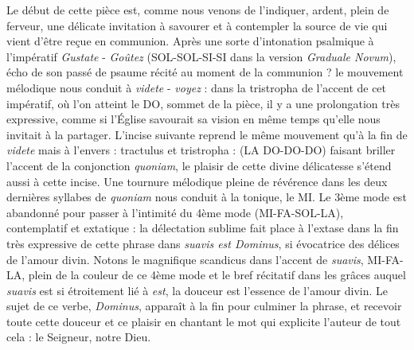 \documentclass[Session2026.tex]{subfiles}
\begin{document}
Le début de cette pièce est, comme nous venons de l'indiquer, ardent,
plein de ferveur, une délicate invitation à savourer et à contempler la
source de vie qui vient d'être reçue en communion. Après une sorte
d'intonation psalmique à l'impératif \emph{Gustate} - \emph{Goûtez}
(SOL-SOL-SI-SI dans la version \emph{Graduale Novum}), écho de son passé
de psaume récité au moment de la communion ? le mouvement mélodique nous
conduit à \emph{videte} - \emph{voyez} : dans la tristropha de l'accent
de cet impératif, où l'on atteint le DO, sommet de la pièce, il y a une
prolongation très expressive, comme si l'Église savourait sa vision en
même temps qu'elle nous invitait à la partager. L'incise suivante
reprend le même mouvement qu'à la fin de \emph{videte} mais à l'envers :
tractulus et tristropha : (LA DO-DO-DO) faisant briller l'accent de la
conjonction \emph{quoniam}, le plaisir de cette divine délicatesse
s'étend aussi à cette incise. Une tournure mélodique pleine de révérence
dans les deux dernières syllabes de \emph{quoniam} nous conduit à la
tonique, le MI. Le 3ème mode est abandonné pour passer à l'intimité du
4ème mode (MI-FA-SOL-LA), contemplatif et extatique : la délectation
sublime fait place à l'extase dans la fin très expressive de cette
phrase dans \emph{suavis est Dominus}, si évocatrice des délices de
l'amour divin. Notons le magnifique scandicus dans l'accent de
\emph{suavis}, MI-FA-LA, plein de la couleur de ce 4ème mode et le bref
récitatif dans les grâces auquel \emph{suavis} est si étroitement lié à
\emph{est}, la douceur est l'essence de l'amour divin. Le sujet de ce
verbe, \emph{Dominus}, apparaît à la fin pour culminer la phrase, et
recevoir toute cette douceur et ce plaisir en chantant le mot qui
explicite l'auteur de tout cela : le Seigneur, notre Dieu.
\end{document}
